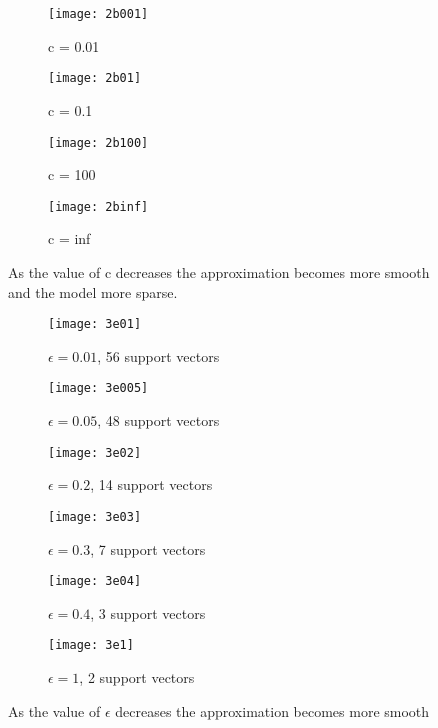 \documentclass[conference,compsoc]{IEEEtran}
\begin{document}
\begin{figure}
\centering
  \begin{subfigure}{8cm}
    \centering\texttt{[image: 2b001]}

    \caption{c = 0.01 }
  \end{subfigure}
  \begin{subfigure}{8cm}
    \centering\texttt{[image: 2b01]}
    \caption{c = 0.1}
  \end{subfigure}
 \vspace{1cm}
  \begin{subfigure}{8cm}
    \centering\texttt{[image: 2b100]}
    \caption{c = 100}
  \end{subfigure}
  \begin{subfigure}{8cm}
    \centering\texttt{[image: 2binf]}
    \caption{c = inf}
  \end{subfigure}

  \caption{As the value of c decreases the approximation becomes more smooth and the model more sparse.}
    \label{fig:bound}
\end{figure}




\begin{figure}
\centering
  \begin{subfigure}{8cm}
    \centering\texttt{[image: 3e01]}

\caption{$\epsilon = 0.01$, 56 support vectors }
  \end{subfigure}
  \begin{subfigure}{8cm}
    \centering\texttt{[image: 3e005]}
\caption{$\epsilon = 0.05$, 48 support vectors}
  \end{subfigure}
 \vspace{1cm}
  \begin{subfigure}{8cm}
    \centering\texttt{[image: 3e02]}
    \caption{$\epsilon = 0.2$, 14 support vectors}
  \end{subfigure}
  \begin{subfigure}{8cm}
    \centering\texttt{[image: 3e03]}
\caption{$\epsilon = 0.3$, 7 support vectors}
  \end{subfigure}
    \begin{subfigure}{8cm}
    \centering\texttt{[image: 3e04]}
\caption{$\epsilon = 0.4$, 3 support vectors}
  \end{subfigure}
    \begin{subfigure}{8cm}
    \centering\texttt{[image: 3e1]}
\caption{$\epsilon = 1$, 2 support vectors}
  \end{subfigure}

  \caption{As the value of $\epsilon$ decreases the approximation becomes more smooth}
    \label{fig:ep}
\end{figure}
\end{document}
